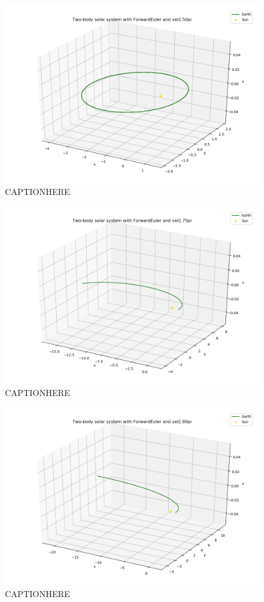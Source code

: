 \documentclass{article}
\begin{document}
    \begin{figure}[H]
        \centering
        \includegraphics[width = 11cm]{img/plot3D_S_E_F_vel250pi.png}
        \caption{CAPTIONHERE}
        \label{fig:plot3D_S_E_F_vel250pi}
    \end{figure}

    \begin{figure}[H]
        \centering
        \includegraphics[width = 11cm]{img/plot3D_S_E_F_vel275pi.png}
        \caption{CAPTIONHERE}
        \label{fig:plot3D_S_E_F_vel275pi}
    \end{figure}

    \begin{figure}[H]
        \centering
        \includegraphics[width = 11cm]{img/plot3D_S_E_F_vel280pi.png}
        \caption{CAPTIONHERE}
        \label{fig:plot3D_S_E_F_vel280pi}
    \end{figure}
\end{document}
